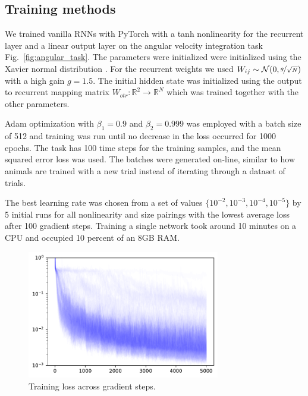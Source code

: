 \documentclass{article} %
\newcounter{ct}
\newcommand{\reals}{\mathbb{R}}
\theoremstyle{definition}
\theoremstyle{remark}
\begin{document}
\newpage
\subsection{Training methods}

 We trained vanilla RNNs with PyTorch \citep{paszke2017automatic} with a tanh nonlinearity for the recurrent layer and a linear output layer on the angular velocity integration task Fig.~\ref{fig:angular_task}.
The parameters were initialized were initialized using the Xavier normal distribution \citep{Glorot2010}.
For the recurrent weights we used \(W_{ij}\sim\mathcal{N}(0, \nicefrac{g}{\sqrt{N}})\) with a high gain \(g=1.5\).
The initial hidden state was initialized using the output to recurrent mapping matrix \(W_{otr}\colon\reals^2\rightarrow\reals^{N}\) which was trained together with the other parameters.

Adam optimization with \(\beta_1=0.9\) and \(\beta_2=0.999\) was employed with a batch size of 512 and training was run until no decrease in the loss occurred for 1000 epochs.
The task has 100 time steps for the training samples, and the mean squared error loss was used.
The batches were generated on-line, similar to how animals are trained with a new trial instead of iterating through a dataset of trials.


The best learning rate was chosen from a set of values \(\{10^{-2},10^{-3},10^{-4},10^{-5}\}\) by 5 initial runs for all nonlinearity and size pairings with the lowest average loss after 100 gradient steps.
Training a single network took around 10 minutes on a CPU and occupied 10 percent of an 8GB RAM.


 \begin{figure}[tbhp]
     \centering
    \includegraphics[width=0.75\textwidth]{training_losses}
       \caption{Training loss across gradient steps.}\label{fig:training_losses}
\end{figure}
\end{document}

